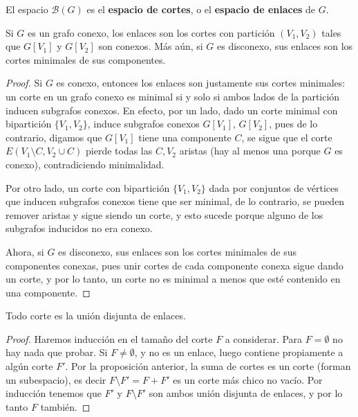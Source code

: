 \documentclass[../main.tex]{subfiles}
\begin{document}
\begin{definition}
El espacio $\mathcal{B} (G)$ es el \textbf{espacio de cortes}, o el \textbf{espacio de enlaces} de $G$.
\end{definition}

\begin{proposition}\label{proposition:caracterizacion de enlaces en grafos conexos}
Si $G$ es un grafo conexo, los enlaces son los cortes con partición $(V_1, V_2)$ tales que $G[V_1]$ y $G[V_2]$ son conexos. Más aún, si $G$ es disconexo, sus enlaces son los cortes minimales de sus componentes.
\end{proposition}
\begin{proof}
Si $G$ es conexo, entonces los enlaces son justamente sus cortes minimales: un corte en un grafo conexo es minimal si y solo si ambos lados de la partición inducen subgrafos conexos. En efecto, por un lado, dado un corte minimal con bipartición $\{V_1,V_2\}$, induce subgrafos conexos $G[V_1]$, $G[V_2]$, pues de lo contrario, digamos que $G[V_1]$ tiene una componente $C$, se sigue que el corte $E(V_1 \setminus C, V_2 \cup C)$ pierde todas las $C,V_2$ aristas (hay al menos una porque $G$ es conexo), contradiciendo minimalidad.

 Por otro lado, un corte con bipartición $\{V_1,V_2\}$ dada por conjuntos de vértices que inducen subgrafos conexos tiene que ser minimal, de lo contrario, se pueden remover aristas y sigue siendo un corte, y esto sucede porque alguno de los subgrafos inducidos no era conexo.

 Ahora, si $G$ es disconexo, sus enlaces son los cortes minimales de sus componentes conexas, pues unir cortes de cada componente conexa sigue dando un corte, y por lo tanto, un corte no es minimal a menos que esté contenido en una componente.
\end{proof}

\begin{lemma}
Todo corte es la unión disjunta de enlaces.
\end{lemma}
\begin{proof}
Haremos inducción en el tamaño del corte $F$ a considerar. Para $F = \emptyset$ no hay nada que probar. Si $F \neq \emptyset$, y no es un enlace, luego contiene propiamente a algún corte $F'$. Por la proposición anterior, la suma de cortes es un corte (forman un subespacio), es decir $F \setminus F' = F + F'$ es un corte más chico no vacío. Por inducción tenemos que $F'$ y $F \setminus F'$ son ambos unión disjunta de enlaces, y por lo tanto $F$ también.
\end{proof}
\end{document}
